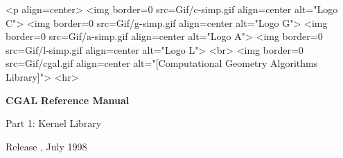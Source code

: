
\pagestyle{empty}

\begin{titlepage}
\mbox{}
\vskip3cm

\ccTexHtml
{\centerline{
    }}
 {<p align=center>
   <img border=0 src=Gif/c-simp.gif align=center alt="Logo C">
   <img border=0 src=Gif/g-simp.gif align=center alt="Logo G">
   <img border=0 src=Gif/a-simp.gif align=center alt="Logo A">
   <img border=0 src=Gif/l-simp.gif align=center alt="Logo L">
   <br>
   <img border=0 src=Gif/cgal.gif align=center
    alt="[Computational Geometry Algorithms Library]">
    <hr>}

\vskip2cm
\centerline{ {\Huge\bf CGAL} {\huge\bf Reference Manual } }
\vskip1cm
\centerline{ {\huge Part 1: Kernel Library } }

\vskip2cm
\newcommand{\mydate}{July 1998}
\ccTexHtml
{\renewcommand{\mydate}{\ifcase\the\month \or January\or
    February\or March\or April\or May\or June\or July\or August\or
    September\or October\or November\or December\fi~\the\year}}{}
  \centerline{ {\large Release \cgalrelease, \mydate} }

\end{titlepage}




